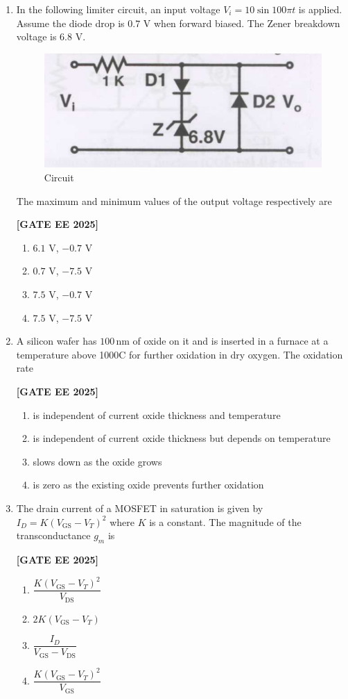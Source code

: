 \documentclass[12pt]{article}
\begin{document}
\begin{enumerate}[leftmargin=2.5em, label=\textbf{Q.\arabic*}., itemsep=2em]
\item In the following limiter circuit, an input voltage $V_i=10\sin100\pi t$ is applied. Assume the diode drop is $0.7$ V when forward biased. The Zener breakdown voltage is $6.8$ V.
\begin{figure}[H]\centering
\includegraphics[width=0.7\columnwidth]{figs/q17.png}
\caption{Circuit}
\label{fig:q17}
\end{figure}

The maximum and minimum values of the output voltage respectively are
 
\noindent \textbf{[GATE EE 2025]}
\begin{enumerate}
  \item $6.1$ V, $-0.7$ V
  \item $0.7$ V, $-7.5$ V
  \item $7.5$ V, $-0.7$ V
  \item $7.5$ V, $-7.5$ V
\end{enumerate}

\item A silicon wafer has $100\,\mathrm{nm}$ of oxide on it and is inserted in a furnace at a temperature above 1000\degree C for further oxidation in dry oxygen. The oxidation rate
 
\noindent \textbf{[GATE EE 2025]}
\begin{enumerate}
  \item is independent of current oxide thickness and temperature
  \item is independent of current oxide thickness but depends on temperature
  \item slows down as the oxide grows
  \item is zero as the existing oxide prevents further oxidation
\end{enumerate}

\item The drain current of a MOSFET in saturation is given by $I_D=K(V_{\mathrm{GS}}-V_T)^2$ where $K$ is a constant.
The magnitude of the transconductance $g_m$ is
 
\noindent \textbf{[GATE EE 2025]}
\begin{enumerate}
  \item $\dfrac{K(V_{\mathrm{GS}}-V_T)^2}{V_{\mathrm{DS}}}$
  \item $2K(V_{\mathrm{GS}}-V_T)$
  \item $\dfrac{I_D}{V_{\mathrm{GS}}-V_{\mathrm{DS}}}$
  \item $\dfrac{K(V_{\mathrm{GS}}-V_T)^2}{V_{\mathrm{GS}}}$
\end{enumerate}


\end{enumerate}
\end{document}
